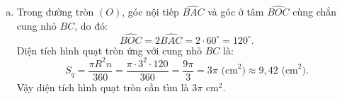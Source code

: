 \begin{bt}
{\begin{enumerate}[a)]
\begin{itemize}
		\item $\widehat{BAH}$ là góc chung;
		\item $\widehat{AMH} = \widehat{AHB} = 90^\circ$.
	\end{itemize}
	Do đó $\triangle AHM \sim \triangle ABH$ (g-g).
	Suy ra $\dfrac{AH}{AB} = \dfrac{AM}{AH} \implies AM \cdot AB = AH^2$.
	Chứng minh tương tự, xét $\triangle AHN$ và $\triangle ACH$ có:
	\begin{itemize}
		\item $\widehat{CAH}$ là góc chung;
		\item $\widehat{ANH} = \widehat{AHC} = 90^\circ$.
	\end{itemize}
	Do đó $\triangle AHN \sim \triangle ACH$ (g-g).
	Suy ra $\dfrac{AH}{AC} = \dfrac{AN}{AH} \implies AN \cdot AC = AH^2$.
	Từ đó suy ra $AM \cdot AB = AN \cdot AC = AH^2$.
	\item Trong đường tròn $(O)$, góc nội tiếp $\widehat{BAC}$ và góc ở tâm $\widehat{BOC}$ cùng chắn cung nhỏ $BC$, do đó:
	$$\widehat{BOC} = 2\widehat{BAC} = 2 \cdot 60^\circ = 120^\circ.$$
	Diện tích hình quạt tròn ứng với cung nhỏ $BC$ là:
	$$S_q = \dfrac{\pi R^2 n}{360} = \dfrac{\pi \cdot 3^2 \cdot 120}{360} = \dfrac{9\pi}{3} = 3\pi\text{ (cm}^2\text{)} \approx 9{,}42\text{ (cm}^2\text{)}.$$
	Vậy diện tích hình quạt tròn cần tìm là $3\pi\text{ cm}^2$.
\end{enumerate}
}
\end{bt}

